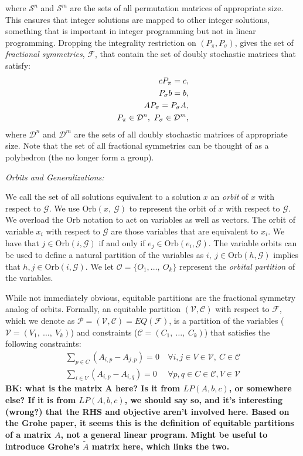 \documentclass[runningheads]{llncs}
\newcommand{\cP}{{\mathcal P}}
\newcommand{\cF}{{\mathcal F}}
\newcommand{\cG}{{\mathcal G}}
\newcommand{\cO}{{\mathcal O}}
\newcommand{\cC}{{\mathcal C}}
\newcommand{\cV}{{\mathcal V}}
\newcommand{\cS}{{\mathcal S}}
\newcommand{\cD}{{\mathcal D}}
\begin{document}
\noindent where $\cS^n$ and $\cS^m$ are the sets of all permutation matrices of appropriate size. This ensures that integer solutions are mapped to other integer solutions, something that is important in integer programming but not in linear programming. Dropping the integrality restriction on $(P_\pi, P_\sigma)$, gives the set of {\em fractional symmetries}, $\cF$, that contain the set of doubly stochastic matrices that satisfy:
	\begin{align}  \label{eq:fractional}
c  P_\pi = c, \\ \notag
P_\sigma b =b,\\ \notag
A  P_\pi = P_\sigma A, \\ \notag
P_\pi \in \cD^n,\ P_\sigma \in \cD^m,
\end{align}
where $\cD^n$ and $\cD^m$ are the sets of all doubly stochastic matrices of appropriate size. Note that the set of all fractional symmetries can be thought of as a polyhedron (the no longer form a group). 

{\em Orbits and Generalizations:}


We call the set of all solutions equivalent to a
solution $x$ an {\em orbit} of $x$ with respect to $\cG$. We use
$\mbox{Orb}(x,\ \cG)$ to represent the orbit of $x$ with respect to $\cG$. We
overload the $\mbox{Orb}$ notation to act on variables as well as vectors. The
orbit of variable $x_i$ with respect to $\cG$ are those variables that are
equivalent to $x_i$. We have that $j \in \mbox{Orb}(i,\cG)$ if and only if $e_j
\in \mbox{Orb}(e_i,\cG)$. The variable orbits can be used to define a natural
partition of the variables as $i,\ j \in \mbox{Orb}(h,\cG)$ implies that $h, j
\in \mbox{Orb}(i,\cG)$. We let $\cO= \{O_1,\ldots,\ O_k\}$ represent the {\em orbital partition} of the variables. 

While not immediately obvious, equitable partitions are the fractional symmetry analog of orbits. Formally, an equitable partition $(\cV, \cC)$ with respect to $\cF$, which we denote as $\cP = (\cV,\cC) =  EQ( \cF)$, is a partition of the variables ($\cV = (V_1,\ \ldots,\ V_k)$) and constraints ($\cC = (C_1,\ \ldots,\ C_k)$) that satisfies the following constraints:
\begin{align}
\sum_{p \in C} \left(A_{i,p} - A_{j,p}\right) = 0 & \ \forall i,j \in V \in \cV,\ C \in \cC\\
\sum_{i \in V} \left(A_{i,p} - A_{i,q}\right) = 0 & \ \forall p,q \in C \in \cC, V \in \cV 
\end{align}
{\bf BK: what is the matrix A here? Is it from $LP(A,b,c)$, or somewhere else? If it is from $LP(A,b,c)$, we should say so, and it's interesting (wrong?) that the RHS and objective aren't involved here. Based on the Grohe paper, it seems this is the definition of equitable partitions of a matrix $A$, not a general linear program. Might be useful to introduce Grohe's $\tilde{A}$ matrix here, which links the two.}
\end{document}
